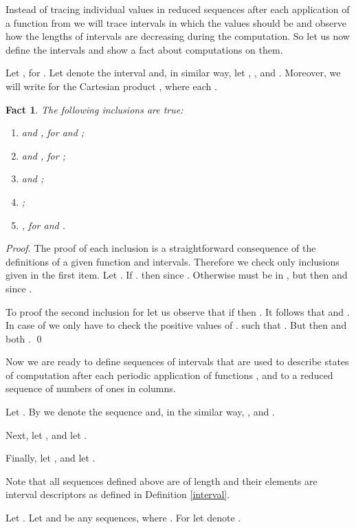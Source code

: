 \documentclass{llncs}
\newtheorem{fact}[theorem]{Fact}
\begin{document}
Instead of tracing individual values in reduced sequences after each
application of a function from
 we 
will
trace intervals in which the values should be and observe how the
lengths of intervals are decreasing during the computation. So let us
now define the intervals and show a fact about computations on them.
\begin{definition} \label{interval}
Let ,  for . Let  denote the
interval  and, in similar way, let , , 
and . Moreover, we
will write  for the Cartesian product , where each .
\end{definition}
\begin{fact} \label{fct-12}
The following inclusions are true:
\begin{enumerate}
\item  and 
  , for  and ;
\item  and 
  , for ;
\item  and ;
\item ;
\item , 
                              for  and .
\end{enumerate}
\end{fact}
\begin{proof}
The proof of each inclusion is a straightforward consequence of the
definitions of a given function and intervals. Therefore we check only
inclusions given in the first item. Let . If . then  since . Otherwise  must be in , but
  then  and  since .

To proof the second inclusion for  let us observe that if 
then . It follows that  and
. In case of  we only have
to check the positive values of . such that . But then
 and both . \qed
\end{proof}

Now we are ready to define sequences of intervals that are used to
describe states of computation after each periodic application of
functions ,  and  to a reduced
sequence of numbers of ones in columns.

\begin{definition}
Let . By  we denote the sequence
 and, in the similar way, ,  and .

Next, let ,  and let .

Finally, let ,  and let .
\end{definition}

Note that all sequences defined above are of length
 and their elements are interval
descriptors as defined in Definition \ref{interval}.

\begin{definition}
Let . Let  and
 be any sequences, where . For
 let  denote .
\end{definition}
\end{document}
